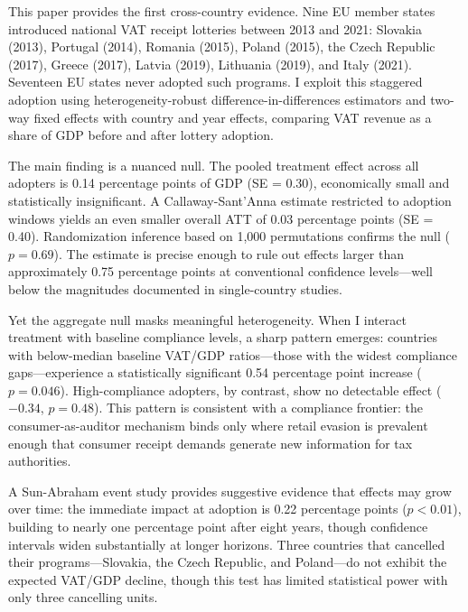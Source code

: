 \documentclass[12pt]{article}
\begin{document}
This paper provides the first cross-country evidence. Nine EU member states introduced national VAT receipt lotteries between 2013 and 2021: Slovakia (2013), Portugal (2014), Romania (2015), Poland (2015), the Czech Republic (2017), Greece (2017), Latvia (2019), Lithuania (2019), and Italy (2021). Seventeen EU states never adopted such programs. I exploit this staggered adoption using heterogeneity-robust difference-in-differences estimators \citep{CallawayandSantAnna2021, SunandAbraham2021} and two-way fixed effects with country and year effects, comparing VAT revenue as a share of GDP before and after lottery adoption.

The main finding is a nuanced null. The pooled treatment effect across all adopters is 0.14 percentage points of GDP (SE = 0.30), economically small and statistically insignificant. A Callaway-Sant'Anna estimate restricted to adoption windows yields an even smaller overall ATT of 0.03 percentage points (SE = 0.40). Randomization inference based on 1,000 permutations confirms the null ($p = 0.69$). The estimate is precise enough to rule out effects larger than approximately 0.75 percentage points at conventional confidence levels---well below the magnitudes documented in single-country studies.

Yet the aggregate null masks meaningful heterogeneity. When I interact treatment with baseline compliance levels, a sharp pattern emerges: countries with below-median baseline VAT/GDP ratios---those with the widest compliance gaps---experience a statistically significant 0.54 percentage point increase ($p = 0.046$). High-compliance adopters, by contrast, show no detectable effect ($-0.34$, $p = 0.48$). This pattern is consistent with a compliance frontier: the consumer-as-auditor mechanism binds only where retail evasion is prevalent enough that consumer receipt demands generate new information for tax authorities.

A Sun-Abraham event study provides suggestive evidence that effects may grow over time: the immediate impact at adoption is 0.22 percentage points ($p < 0.01$), building to nearly one percentage point after eight years, though confidence intervals widen substantially at longer horizons. Three countries that cancelled their programs---Slovakia, the Czech Republic, and Poland---do not exhibit the expected VAT/GDP decline, though this test has limited statistical power with only three cancelling units.
\end{document}
